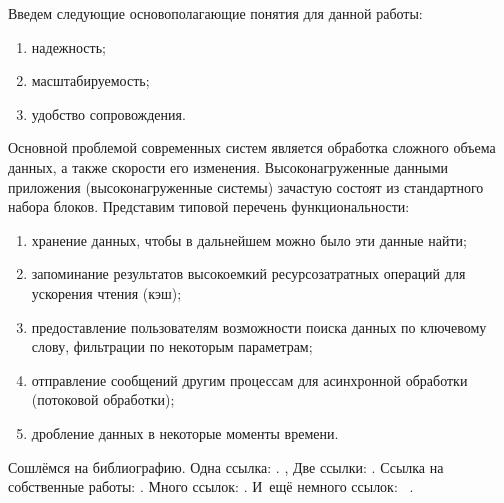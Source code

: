 Введем следующие основополагающие понятия для данной работы:
\begin{enumerate}
	\item надежность;
	\item масштабируемость;
	\item удобство сопровождения.
\end{enumerate}


Основной проблемой современных систем является обработка сложного объема данных, а также скорости его изменения. Высоконагруженные данными приложения (высоконагруженные системы) зачастую состоят из стандартного набора блоков. Представим типовой перечень функциональности:
\begin{enumerate}
	\item хранение данных, чтобы в дальнейшем можно было эти данные найти;
	\item запоминание результатов высокоемкий ресурсозатратных операций для ускорения чтения (кэш);
	\item предоставление пользователям возможности поиска данных по ключевому слову, фильтрации по некоторым параметрам;
	\item отправление сообщений другим процессам для асинхронной обработки (потоковой обработки);
	\item дробление данных в некоторые моменты времени.
\end{enumerate}





Сошлёмся на библиографию.
Одна ссылка: \cite[с.~54]{Sokolov}\cite[с.~36]{Gaidaenko}.
\cite{Sokolov}, \cite{Gaidaenko}
Две ссылки: \cite{Sokolov,Gaidaenko}.
Ссылка на собственные работы: \cite{vakbib1, confbib2}.
Много ссылок: %
\cite{Lermontov, Management, Borozda, Marketing, Constitution, FamilyCode,
    Gost.7.0.53, Razumovski, Lagkueva, Pokrovski, Methodology, Berestova,
    Kriger}%
%
.
И~ещё немного ссылок:~\cite{Article,Book,Booklet,Conference,Inbook,Incollection,Manual,Mastersthesis,
    Misc,Phdthesis,Proceedings,Techreport,Unpublished}
\cite{medvedev2006jelektronnye, CEAT:CEAT581, doi:10.1080/01932691.2010.513279,
    Gosele1999161,Li2007StressAnalysis, Shoji199895, test:eisner-sample,
    test:eisner-sample-shorted, AB_patent_Pomerantz_1968, iofis_patent1960}%
%
.

